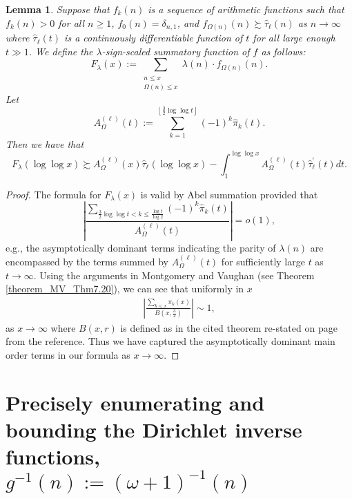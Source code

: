 \documentclass[11pt,reqno,a4letter]{article}
\numberwithin{figure}{section}
\numberwithin{table}{section}
\newcommand{\floor}[1]{\left\lfloor #1 \right\rfloor}
\theoremstyle{plain}
\newtheorem{lemma}[theorem]{Lemma}
\numberwithin{theorem}{section}
\theoremstyle{definition}
\begin{document}
\begin{lemma} 
\label{lemma_CLT_and_AbelSummation} 
Suppose that $f_k(n)$ is a sequence of arithmetic functions 
such that $f_k(n) > 0$ for all $n \geq 1$, $f_0(n) = \delta_{n,1}$, and 
$f_{\Omega(n)}(n) \succsim \widehat{\tau}_{\ell}(n)$ as $n \rightarrow \infty$ where 
$\widehat{\tau}_{\ell}(t)$ is a continuously differentiable function of $t$ for all 
large enough $t \gg 1$.  
We define the $\lambda$-sign-scaled summatory function of $f$ as follows: 
\[
F_{\lambda}(x) := \sum_{\substack{n \leq x \\ \Omega(n) \leq x}} 
     \lambda(n) \cdot f_{\Omega(n)}(n). 
\]
Let 
\[
A_{\Omega}^{(\ell)}(t) := \sum_{k=1}^{\floor{\frac{3}{2} \log\log t}} (-1)^k \widehat{\pi}_k(t). 
\]
Then we have that 
\[
F_{\lambda}(\log\log x) \succsim A_{\Omega}^{(\ell)}(x) \widehat{\tau}_{\ell}(\log\log x) - 
     \int_1^{\log\log x} 
     A_{\Omega}^{(\ell)}(t) \widehat{\tau}_{\ell}^{\prime}(t) dt. 
\]
\end{lemma}
\begin{proof} 
The formula for $F_{\lambda}(x)$ is valid by Abel summation provided that 
\[
\left\lvert \frac{\displaystyle\sum\limits_{\frac{3}{2} \log\log t < k \leq \frac{\log t}{\log 2}} 
     (-1)^k \widehat{\pi}_k(t)}{A_{\Omega}^{(\ell)}(t)}\right\rvert = o(1), 
\]
e.g., the asymptotically dominant terms indicating the parity of 
$\lambda(n)$ are encompassed by the terms summed by $A_{\Omega}^{(\ell)}(t)$ for 
sufficiently large $t$ as $t \rightarrow \infty$. 
Using the arguments in Montgomery and Vaughan \cite[\S 7; Thm.\ 7.20]{MV} (see 
Theorem \ref{theorem_MV_Thm7.20}), we can see that 
uniformly in $x$ 
\begin{align} 
\label{eqn_ProbCLT_for_Omegan_cited_result} 
\left\lvert \frac{\sum_{k \leq x} \pi_k(x)}{B\left(x, \frac{3}{2}\right)} \right\rvert \sim 1, 
\end{align} 
as $x \rightarrow \infty$ where $B(x, r)$ is defined as in the cited theorem re-stated on page 
\pageref{theorem_MV_Thm7.20} from the reference. 
Thus we have captured the asymptotically dominant main order terms in our formula as 
$x \rightarrow \infty$. 
\end{proof} 

\newpage
\section{Precisely enumerating and bounding the 
         Dirichlet inverse functions, $g^{-1}(n) := (\omega+1)^{-1}(n)$} 
\label{Section_InvFunc_PreciseExpsAndAsymptotics} 
\end{document}
